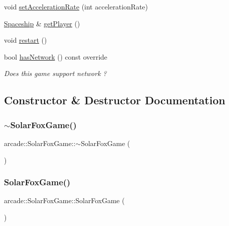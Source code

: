\begin{DoxyCompactItemize}
void \hyperlink{classarcade_1_1_solar_fox_game_a6e846bc8d6fbd3752c5342bfb682e9cb}{set\+Acceleration\+Rate} (int acceleration\+Rate)
\item 
\hyperlink{classarcade_1_1_spaceship}{Spaceship} \& \hyperlink{classarcade_1_1_solar_fox_game_a75c60a8ae25175073200318d3d2072fd}{get\+Player} ()
\item 
void \hyperlink{classarcade_1_1_solar_fox_game_a60c1aad9687dea93c752717672ae31fc}{restart} ()
\item 
bool \hyperlink{classarcade_1_1_solar_fox_game_a4142a002e8b141216c67638ba7a118d3}{has\+Network} () const override
\begin{DoxyCompactList}\small\item\em Does this game support network ? \end{DoxyCompactList}\end{DoxyCompactItemize}


\subsection{Constructor \& Destructor Documentation}
\mbox{\label{classarcade_1_1_solar_fox_game_ab392eb5aaea9402b947efae9e08147dc}} 
\subsubsection{\texorpdfstring{$\sim$\+Solar\+Fox\+Game()}{~SolarFoxGame()}}
{\footnotesize\ttfamily arcade\+::\+Solar\+Fox\+Game\+::$\sim$\+Solar\+Fox\+Game (\begin{DoxyParamCaption}{ }\end{DoxyParamCaption})\hspace{0.3cm}{\ttfamily [virtual]}}

\mbox{\label{classarcade_1_1_solar_fox_game_a8ff7ea5338af65ad2b0f6f038b89b697}} 
\subsubsection{\texorpdfstring{Solar\+Fox\+Game()}{SolarFoxGame()}}
{\footnotesize\ttfamily arcade\+::\+Solar\+Fox\+Game\+::\+Solar\+Fox\+Game (\begin{DoxyParamCaption}{ }\end{DoxyParamCaption})}



